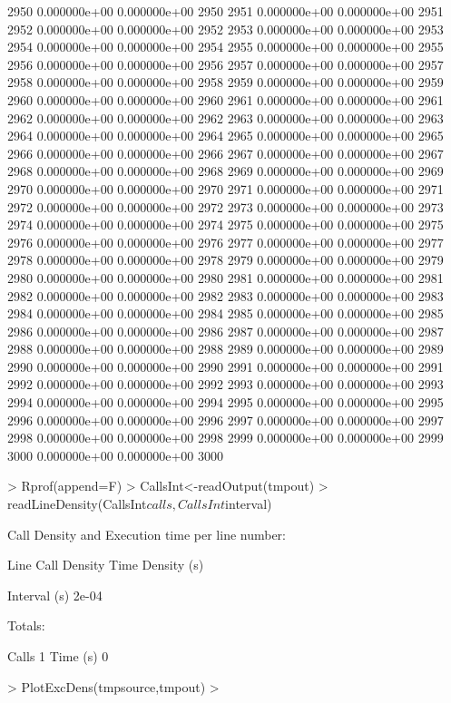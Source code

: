 \documentclass{article}
\begin{document}
\begin{Schunk}
\begin{Soutput}
2950   0.000000e+00   0.000000e+00 2950
2951   0.000000e+00   0.000000e+00 2951
2952   0.000000e+00   0.000000e+00 2952
2953   0.000000e+00   0.000000e+00 2953
2954   0.000000e+00   0.000000e+00 2954
2955   0.000000e+00   0.000000e+00 2955
2956   0.000000e+00   0.000000e+00 2956
2957   0.000000e+00   0.000000e+00 2957
2958   0.000000e+00   0.000000e+00 2958
2959   0.000000e+00   0.000000e+00 2959
2960   0.000000e+00   0.000000e+00 2960
2961   0.000000e+00   0.000000e+00 2961
2962   0.000000e+00   0.000000e+00 2962
2963   0.000000e+00   0.000000e+00 2963
2964   0.000000e+00   0.000000e+00 2964
2965   0.000000e+00   0.000000e+00 2965
2966   0.000000e+00   0.000000e+00 2966
2967   0.000000e+00   0.000000e+00 2967
2968   0.000000e+00   0.000000e+00 2968
2969   0.000000e+00   0.000000e+00 2969
2970   0.000000e+00   0.000000e+00 2970
2971   0.000000e+00   0.000000e+00 2971
2972   0.000000e+00   0.000000e+00 2972
2973   0.000000e+00   0.000000e+00 2973
2974   0.000000e+00   0.000000e+00 2974
2975   0.000000e+00   0.000000e+00 2975
2976   0.000000e+00   0.000000e+00 2976
2977   0.000000e+00   0.000000e+00 2977
2978   0.000000e+00   0.000000e+00 2978
2979   0.000000e+00   0.000000e+00 2979
2980   0.000000e+00   0.000000e+00 2980
2981   0.000000e+00   0.000000e+00 2981
2982   0.000000e+00   0.000000e+00 2982
2983   0.000000e+00   0.000000e+00 2983
2984   0.000000e+00   0.000000e+00 2984
2985   0.000000e+00   0.000000e+00 2985
2986   0.000000e+00   0.000000e+00 2986
2987   0.000000e+00   0.000000e+00 2987
2988   0.000000e+00   0.000000e+00 2988
2989   0.000000e+00   0.000000e+00 2989
2990   0.000000e+00   0.000000e+00 2990
2991   0.000000e+00   0.000000e+00 2991
2992   0.000000e+00   0.000000e+00 2992
2993   0.000000e+00   0.000000e+00 2993
2994   0.000000e+00   0.000000e+00 2994
2995   0.000000e+00   0.000000e+00 2995
2996   0.000000e+00   0.000000e+00 2996
2997   0.000000e+00   0.000000e+00 2997
2998   0.000000e+00   0.000000e+00 2998
2999   0.000000e+00   0.000000e+00 2999
3000   0.000000e+00   0.000000e+00 3000
\end{Soutput}
\begin{Sinput}
> Rprof(append=F)
> CallsInt<-readOutput(tmpout)
> readLineDensity(CallsInt$calls,CallsInt$interval)
\end{Sinput}
\begin{Soutput}
 Call Density and Execution time per line number:

      Line  Call Density  Time Density (s)

Interval (s)	 2e-04 


 Totals:

 Calls		 1 
 Time (s)	 0 
\end{Soutput}
\begin{Sinput}
> PlotExcDens(tmpsource,tmpout)
> 
\end{Sinput}
\end{Schunk}
\end{document}
